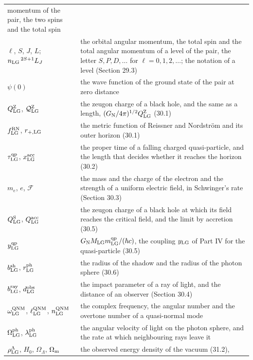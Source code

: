 \documentclass[
  10pt,
]{article}
\begin{document}
\begin{longtable}[]{@{}
  >{\raggedright\arraybackslash}p{}
  >{\raggedright\arraybackslash}p{}@{}}
momentum of the pair, the two spins and the total spin \\
\(\ell\), \(S\), \(J\), \(L\); \(n_{\rm LG}\,{}^{2S+1}L_J\) & the
orbital angular momentum, the total spin and the total angular momentum
of a level of the pair, the letter \(S,P,D,\dots\) for
\(\ell=0,1,2,\dots\); the notation of a level (Section 29.3) \\
\(\psi(0)\) & the wave function of the ground state of the pair at zero
distance \\
\(Q^{\rm Z}_{\rm LG}\), \(\mathcal Q^{\rm Z}_{\rm LG}\) & the zeugon
charge of a black hole, and the same as a length,
\((G_{\rm N}/4\pi)^{1/2}Q^{\rm Z}_{\rm LG}\) (30.1) \\
\(f^{\rm RN}_{\rm LG}\), \(r_{+,\rm LG}\) & the metric function of
Reissner and Nordström and its outer horizon (30.1) \\
\(\tau^{\rm qp}_{\rm LG}\), \(x^{\rm acc}_{\rm LG}\) & the proper time
of a falling charged quasi-particle, and the length that decides whether
it reaches the horizon (30.2) \\
\(m_e\), \(e\), \(\mathcal F\) & the mass and the charge of the electron
and the strength of a uniform electric field, in Schwinger's rate
(Section 30.3) \\
\(Q^{\rm S}_{\rm LG}\), \(Q^{\rm acc}_{\rm LG}\) & the zeugon charge of
a black hole at which its field reaches the critical field, and the
limit by accretion (30.5) \\
\(y^{\rm qp}_{\rm LG}\) &
\(G_{\rm N}M_{\rm LG}m^{\rm qp}_{\rm LG}/(\hbar c)\), the coupling
\(y_{\rm LG}\) of Part IV for the quasi-particle (30.5) \\
\(b^{\rm sh}_{\rm LG}\), \(r^{\rm ph}_{\rm LG}\) & the radius of the
shadow and the radius of the photon sphere (30.6) \\
\(b^{\rm ray}_{\rm LG}\), \(d^{\rm obs}_{\rm LG}\) & the impact
parameter of a ray of light, and the distance of an observer (Section
30.4) \\
\(\omega^{\rm QNM}_{\rm LG}\), \(\ell^{\rm QNM}_{\rm LG}\),
\(n^{\rm QNM}_{\rm LG}\) & the complex frequency, the angular number and
the overtone number of a quasi-normal mode \\
\(\Omega^{\rm ph}_{\rm LG}\), \(\lambda^{\rm ph}_{\rm LG}\) & the
angular velocity of light on the photon sphere, and the rate at which
neighbouring rays leave it \\
\(\rho^\Lambda_{\rm LG}\), \(H_0\), \(\Omega_\Lambda\),
\(\Omega_{\rm m}\) & the observed energy density of the vacuum (31.2),

\end{longtable}
\end{document}
